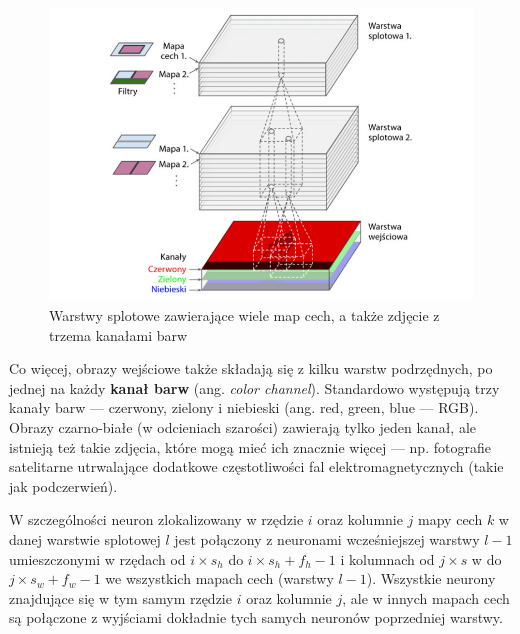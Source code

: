 \documentclass[12pt]{mwbk}
\theoremstyle{plain}
\theoremstyle{definition}
\theoremstyle{remark}
\newcommand\zrodlo[1]{\par\vspace{-3mm}{\small\textit{Źródło: }#1 }}
\begin{document}
\begin{figure}[!h]
	\centering
	\includegraphics[width=\linewidth]{rys/warstwy_cnn_kanaly.png}
	\caption{Warstwy splotowe zawierające wiele map cech, a także zdjęcie z trzema kanałami barw}
	\zrodlo{\cite{geron}}
	\label{fig:warstwy-kanaly}
\end{figure}

Co więcej, obrazy wejściowe także składają się z kilku warstw podrzędnych, po jednej na każdy \textbf{kanał
barw} (ang. \emph{color channel}). Standardowo występują trzy kanały barw — czerwony, zielony i niebieski
(ang. red, green, blue — RGB). Obrazy czarno-białe (w odcieniach szarości) zawierają tylko jeden
kanał, ale istnieją też takie zdjęcia, które mogą mieć ich znacznie więcej — np. fotografie satelitarne
utrwalające dodatkowe częstotliwości fal elektromagnetycznych (takie jak podczerwień).

W szczególności neuron zlokalizowany w rzędzie $i$ oraz kolumnie $j$ mapy cech $k$ w danej warstwie
splotowej $l$ jest połączony z neuronami wcześniejszej warstwy $l-1$ umieszczonymi w rzędach od $i\times s_h$
do $i\times s_h +f_h -1$ i kolumnach od $j\times s$ w do $j\times s_w +f_w -1$ we wszystkich mapach cech (warstwy $l-1$). Wszystkie neurony znajdujące się w tym samym rzędzie $i$ oraz kolumnie $j$, ale w innych
mapach cech są połączone z wyjściami dokładnie tych samych neuronów poprzedniej warstwy.
\end{document}
